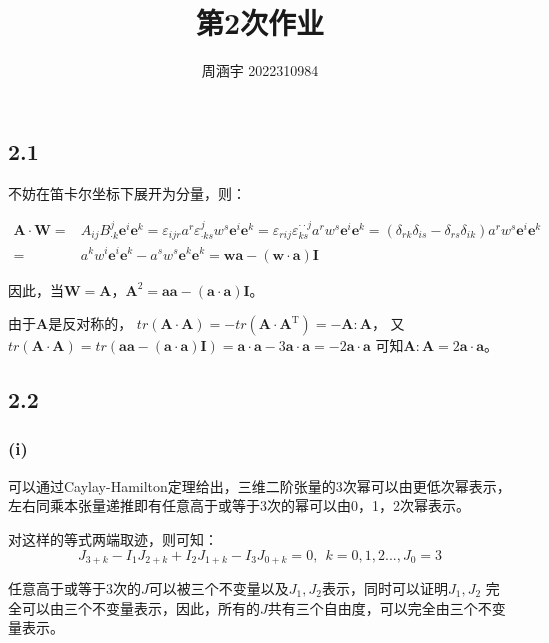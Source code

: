 \documentclass[UTF8,zihao=5]{ctexart}
\title{{\bfseries 第2次作业}}
\author{周涵宇 2022310984}
\date{}
\newcommand{\bm}[1]{{\mathbf{#1}}}
\newcommand{\trans}[0]{^\mathrm{T}}
\begin{document}
\maketitle

\subsection*{2.1}

不妨在笛卡尔坐标下展开为分量，则：

\begin{equation}
    \begin{aligned}
        \bm{A}\cdot\bm{W}= & A_{ij}B^j_{\cdot k}\bm{e}^i\bm{e}^k
        =\varepsilon_{ijr}a^r\varepsilon^j_{\cdot ks}w^s\bm{e}^i\bm{e}^k
        =\varepsilon_{rij}\varepsilon^{\cdot\cdot j}_{ks}a^rw^s\bm{e}^i\bm{e}^k
        =(\delta_{rk}\delta_{is} - \delta_{rs}\delta_{ik})a^rw^s\bm{e}^i\bm{e}^k \\
        =                  & a^kw^i\bm{e}^i\bm{e}^k-a^sw^s\bm{e}^k\bm{e}^k
        =\bm{w}\bm{a}-(\bm{w}\cdot\bm{a})\bm{I}
    \end{aligned}
\end{equation}

因此，当$\bm{W}=\bm{A}$，$\bm{A}^2=\bm{a}\bm{a}-(\bm{a}\cdot\bm{a})\bm{I}$。

由于$\bm{A}$是反对称的，
$tr(\bm{A}\cdot\bm{A}) = -tr(\bm{A}\cdot\bm{A}\trans)=-\bm{A}:\bm{A} $，
又$tr(\bm{A}\cdot\bm{A})=tr(\bm{a}\bm{a}-(\bm{a}\cdot\bm{a})\bm{I})=\bm{a}\cdot\bm{a}-3\bm{a}\cdot\bm{a}=-2\bm{a}\cdot\bm{a}$
可知$\bm{A}:\bm{A}=2\bm{a}\cdot\bm{a}$。

\subsection*{2.2}
\subsubsection*{(i)}
可以通过Caylay-Hamilton定理给出，三维二阶张量的3次幂可以由更低次幂表示，
左右同乘本张量递推即有任意高于或等于3次的幂可以由0，1，2次幂表示。



对这样的等式两端取迹，则可知：
\begin{equation}
    J_{3+k}-I_1J_{2+k}+I_2J_{1+k}-I_3J_{0+k}=0,\ \  k=0,1,2..., J_0=3
\end{equation}

任意高于或等于3次的$J$可以被三个不变量以及$J_1,J_2$表示，同时可以证明$J_1,J_2$
完全可以由三个不变量表示，因此，所有的$J$共有三个自由度，可以完全由三个不变量表示。
\end{document}

